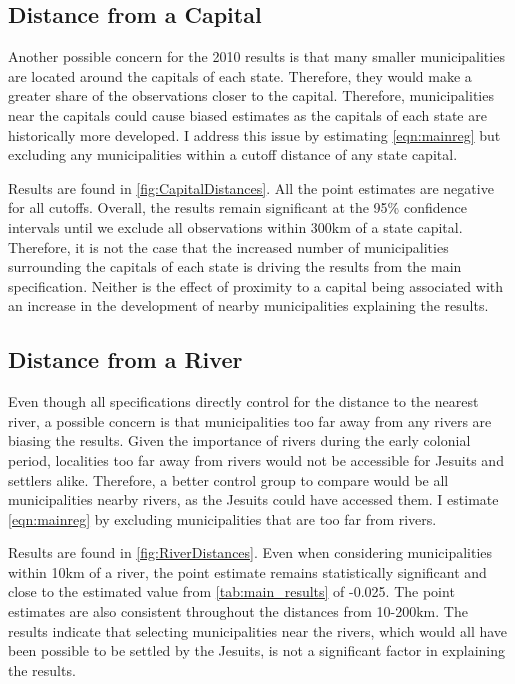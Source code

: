 \documentclass{article}
\begin{document}
\subsection{Distance from a Capital}

Another possible concern for the 2010 results is that many smaller municipalities are located around the capitals of each state. Therefore, they would make a greater share of the observations closer to the capital. Therefore, municipalities near the capitals could cause biased estimates as the capitals of each state are historically more developed. I address this issue by estimating \autoref{eqn:mainreg} but excluding any municipalities within a cutoff distance of any state capital. 

Results are found in \autoref{fig:CapitalDistances}. All the point estimates are negative for all cutoffs. 
Overall, the results remain significant at the 95\% confidence intervals until we exclude all observations within 300km of a state capital. 
Therefore, it is not the case that the increased number of municipalities surrounding the capitals of each state is driving the results from the main specification. 
Neither is the effect of proximity to a capital being associated with an increase in the development of nearby municipalities explaining the results.

\subsection{Distance from a River}

Even though all specifications directly control for the distance to the nearest river, a possible concern is that municipalities too far away from any rivers are biasing the results. 
Given the importance of rivers during the early colonial period, localities too far away from rivers would not be accessible for Jesuits and settlers alike. 
Therefore, a better control group to compare would be all municipalities nearby rivers, as the Jesuits could have accessed them. 
I estimate \autoref{eqn:mainreg} by excluding municipalities that are too far from rivers. 

Results are found in \autoref{fig:RiverDistances}. Even when considering municipalities within 10km of a river, the point estimate remains statistically significant and close to the estimated value from \autoref{tab:main_results} of -0.025.
The point estimates are also consistent throughout the distances from 10-200km. 
The results indicate that selecting municipalities near the rivers, which would all have been possible to be settled by the Jesuits, is not a significant factor in explaining the results. 
\end{document}
